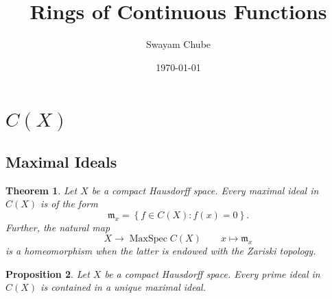 \documentclass[12pt]{article}
\title{Rings of Continuous Functions}
\author{Swayam Chube}
\date{\today}
\theoremstyle{thmstyle}
\newtheorem{theorem}{Theorem}[section]
\newtheorem{proposition}[theorem]{Proposition}
\theoremstyle{defstyle}
\newcommand{\frakm}{\mathfrak{m}} %
\newcommand{\MaxSpec}{\operatorname{MaxSpec}}
\begin{document}
\maketitle

\section{\texorpdfstring{$C(X)$}{C(X)}}

\subsection{Maximal Ideals}

\begin{theorem}
    Let $X$ be a compact Hausdorff space. Every maximal ideal in $C(X)$ is of the form 
    \begin{equation*}
        \frakm_x = \left\{f\in C(X)\colon f(x) = 0\right\}.
    \end{equation*}
    Further, the natural map
    \begin{equation*}
        X\longrightarrow\MaxSpec C(X)\qquad x\longmapsto\frakm_x
    \end{equation*}
    is a homeomorphism when the latter is endowed with the Zariski topology.
\end{theorem}

\begin{proposition}
    Let $X$ be a compact Hausdorff space. Every prime ideal in $C(X)$ is contained in a unique maximal ideal.
\end{proposition}
\end{document}
